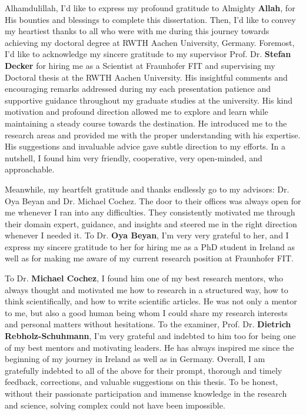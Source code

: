 

\begin{acknowledgements}
    Alhamdulillah, I'd like to express my profound gratitude to Almighty \textbf{Allah}, for His bounties and blessings to complete this dissertation. Then, I'd like to convey my heartiest thanks to all who were with me during this journey towards achieving my doctoral degree at RWTH Aachen University, Germany. Foremost, I'd like to acknowledge my sincere gratitude to my supervisor Prof. Dr. \textbf{Stefan Decker} for hiring me as a Scientist at Fraunhofer FIT and supervising my Doctoral thesis at the RWTH Aachen University. His insightful comments and encouraging remarks addressed during my each presentation patience and supportive guidance throughout my graduate studies at the university. His kind motivation and profound direction allowed me to explore and learn while maintaining a steady course towards the destination. He introduced me to the research areas and provided me with the proper understanding with his expertise. His suggestions and invaluable advice gave subtle direction to my efforts. In a nutshell, I found him very friendly, cooperative, very open-minded, and approachable. 
    
    \hspace*{5mm} Meanwhile, my heartfelt gratitude and thanks endlessly go to my advisors: Dr. Oya Beyan and Dr. Michael Cochez. The door to their offices was always open for me whenever I ran into any difficulties. They consistently motivated me through their domain expert, guidance, and insights and steered me in the right direction whenever I needed it. To Dr. \textbf{Oya Beyan}, I'm very very grateful to her, and I express my sincere gratitude to her for hiring me as a PhD student in Ireland as well as for making me aware of my current research position at Fraunhofer FIT. %
    
    \hspace*{5mm} To Dr. \textbf{Michael Cochez}, I found him one of my best research mentors, who always thought and motivated me how to research in a structured way, how to think scientifically, and how to write scientific articles. He was not only a mentor to me, but also a good human being whom I could share my research interests and personal matters without hesitations. To the examiner, Prof. Dr. \textbf{Dietrich Rebholz-Schuhmann}, I'm very grateful and indebted to him too for being one of my best mentors and motivating leaders. He has always inspired me since the beginning of my journey in Ireland as well as in Germany. Overall, I am gratefully indebted to all of the above for their prompt, thorough and timely feedback, corrections, and valuable suggestions on this thesis. To be honest, without their passionate participation and immense knowledge in the research and science, solving complex could not have been impossible.
    

\end{acknowledgements}
